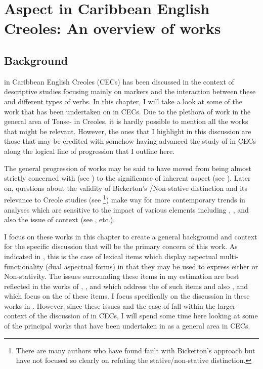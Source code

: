 \chapter{Aspect in Caribbean English Creoles: An overview of
  works}\label{sec:2}\label{ch:2}
\section{Background}\label{sec:2.0}

 in Caribbean English Creoles (CECs) has been discussed in the
context of descriptive studies focusing mainly on 
markers and the interaction between these and different types of
verbs.  In this chapter, I will take a look at some of the work that
has been undertaken on  in CECs.  Due to the plethora of work in
the general area of Tense- in Creoles, it is hardly possible to
mention all the works that might be relevant.  However, the ones that
I highlight in this discussion are those that may be credited with
somehow having advanced the study of  in CECs along the logical
line of progression that I outline here.

The general progression of works may be said to have moved from being
almost strictly concerned with  (see
\citealt{Alleyne1980,Voorhoeve1957}) to the significance of inherent
aspect (see \citealt{Bickerton1975,Bickerton1981}).  Later on, questions about
the validity of Bickerton’s \slash Non-stative distinction and its
relevance to Creole studies (see
\citealt{Jaganauth1987}\footnote{There are many authors who have found
  fault with Bickerton’s approach but have not focused so clearly on
  refuting the stative\slash non-stative distinction.}) make way for more
contemporary trends in analyses which are sensitive to the impact of
various elements including , , and
also the issue of context (see \citealt{Gooden2008,Sidnell2002,Winford1993,
Winford1997,Winford2000}, etc.).

I focus on these works in this chapter to create a general background
and context for the specific discussion that will be the primary
concern of this work.  As indicated in , this is the case
of lexical items which display aspectual multi-functionality (dual
aspectual forms) in that they may be used to express either 
or Non-stativity.  The issues surrounding these items in my estimation
are best reflected in the works of \citet{Alleyne1980},
\citet{Jaganauth1987}, and \citet{Winford1993} which address the
 of such items and also \citet{Sebba1986},
\citet{Seuren1986} and \citet{Kouwenberg1996} which focus on the
 of these items.  I focus specifically on the
discussion in these works in .  However, since these
issues and the case of  fall within the larger
context of the discussion of  in CECs, I will spend some time
here looking at some of the principal works that have been undertaken
in  as a general area in CECs.


